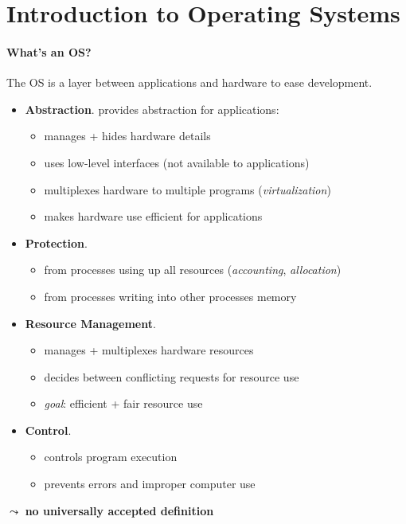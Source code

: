\section{Introduction to Operating Systems}

\paragraph{What's an OS?}
The OS is a layer between applications and hardware to ease development.
\begin{itemize}
	\item \textbf{Abstraction}. provides abstraction for applications:
		\begin{itemize}
			\item manages + hides hardware details
			\item uses low-level interfaces (not available to applications)
			\item multiplexes hardware to multiple programs (\emph{virtualization})
			\item makes hardware use efficient for applications
		\end{itemize}
	\item \textbf{Protection}.
		\begin{itemize}
			\item from processes using up all resources (\emph{accounting}, \emph{allocation})
			\item from processes writing into other processes memory
		\end{itemize}
	\item \textbf{Resource Management}.
		\begin{itemize}
			\item manages + multiplexes hardware resources
			\item decides between conflicting requests for resource use
			\item \emph{goal}: efficient + fair resource use
		\end{itemize}
	\item \textbf{Control}.
		\begin{itemize}
			\item controls program execution
			\item prevents errors and improper computer use
		\end{itemize}
\end{itemize}
$ \leadsto $ \textbf{no universally accepted definition}

